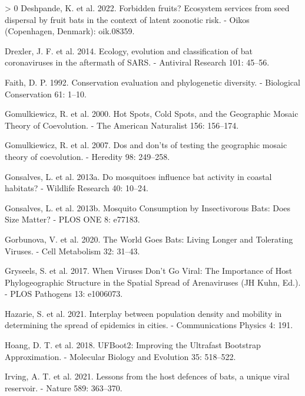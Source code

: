 \documentclass[11pt]{article}
\newlength{\cslhangindent}
\newenvironment{CSLReferences}[3] %
 {%
  \setlength{\parindent}{0pt}
  \ifodd #1 \everypar{\setlength{\hangindent}{\cslhangindent}}\ignorespaces\fi
  \ifnum #2 > 0
  \setlength{\parskip}{#2\baselineskip}
  \fi
 }%
 {}
\begin{document}
\begin{CSLReferences}{1}{0}
\leavevmode\hypertarget{ref-Deshpande2022ForFru}{}%
Deshpande, K. et al. 2022. Forbidden fruits? Ecosystem services from
seed dispersal by fruit bats in the context of latent zoonotic risk. -
Oikos (Copenhagen, Denmark): oik.08359.

\leavevmode\hypertarget{ref-Drexler2014EcoEvo}{}%
Drexler, J. F. et al. 2014. Ecology, evolution and classification of bat
coronaviruses in the aftermath of SARS. - Antiviral Research 101:
45--56.

\leavevmode\hypertarget{ref-Faith1992ConEva}{}%
Faith, D. P. 1992. Conservation evaluation and phylogenetic diversity. -
Biological Conservation 61: 1--10.

\leavevmode\hypertarget{ref-Gomulkiewicz2000HotSpo}{}%
Gomulkiewicz, R. et al. 2000. Hot Spots, Cold Spots, and the Geographic
Mosaic Theory of Coevolution. - The American Naturalist 156: 156--174.

\leavevmode\hypertarget{ref-Gomulkiewicz2007DosDon}{}%
Gomulkiewicz, R. et al. 2007. Dos and don'ts of testing the geographic
mosaic theory of coevolution. - Heredity 98: 249--258.

\leavevmode\hypertarget{ref-Gonsalves2013MosInf}{}%
Gonsalves, L. et al. 2013a. Do mosquitoes influence bat activity in
coastal habitats? - Wildlife Research 40: 10--24.

\leavevmode\hypertarget{ref-Gonsalves2013MosCon}{}%
Gonsalves, L. et al. 2013b. Mosquito Consumption by Insectivorous Bats:
Does Size Matter? - PLOS ONE 8: e77183.

\leavevmode\hypertarget{ref-Gorbunova2020WorGoe}{}%
Gorbunova, V. et al. 2020. The World Goes Bats: Living Longer and
Tolerating Viruses. - Cell Metabolism 32: 31--43.

\leavevmode\hypertarget{ref-Gryseels2017WheVir}{}%
Gryseels, S. et al. 2017. When Viruses Don't Go Viral: The Importance of
Host Phylogeographic Structure in the Spatial Spread of Arenaviruses (JH
Kuhn, Ed.). - PLOS Pathogens 13: e1006073.

\leavevmode\hypertarget{ref-Hazarie2021IntPop}{}%
Hazarie, S. et al. 2021. Interplay between population density and
mobility in determining the spread of epidemics in cities. -
Communications Physics 4: 191.

\leavevmode\hypertarget{ref-Hoang2018UfbImp}{}%
Hoang, D. T. et al. 2018. UFBoot2: Improving the Ultrafast Bootstrap
Approximation. - Molecular Biology and Evolution 35: 518--522.

\leavevmode\hypertarget{ref-Irving2021LesHos}{}%
Irving, A. T. et al. 2021. Lessons from the host defences of bats, a
unique viral reservoir. - Nature 589: 363--370.


\end{CSLReferences}
\end{document}
